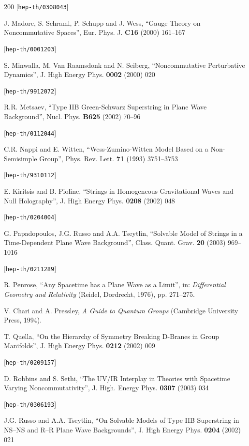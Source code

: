 \begin{thebibliography}{200}
 [{\tt hep-th/0308043}] 

 J. Madore, S. Schraml, P. Schupp and J. Wess, ``Gauge Theory on Noncommutative Spaces'', Eur. Phys. J. {\bf C16} (2000) 161--167 

 [{\tt hep-th/0001203}] 

 S. Minwalla, M. Van Raamsdonk and N. Seiberg, ``Noncommutative Perturbative Dynamics'', J. High Energy Phys. {\bf 0002} (2000) 020 

 [{\tt hep-th/9912072}] 

 R.R. Metsaev, ``Type IIB Green-Schwarz Superstring in Plane Wave Background'', Nucl. Phys. {\bf B625} (2002) 70--96 

 [{\tt hep-th/0112044}] 

 C.R. Nappi and E. Witten, ``Wess-Zumino-Witten Model Based on a Non-Semisimple Group'', Phys. Rev. Lett. {\bf 71} (1993) 3751--3753 

 [{\tt hep-th/9310112}] 

 E. Kiritsis and B. Pioline, ``Strings in Homogeneous Gravitational Waves and Null Holography'', J. High Energy Phys. {\bf 0208} (2002) 048 

 [{\tt hep-th/0204004}] 

 G. Papadopoulos, J.G. Russo and A.A. Tseytlin, ``Solvable Model of Strings in a Time-Dependent Plane Wave Background'', Class. Quant. Grav. {\bf 20} (2003) 969--1016 

 [{\tt hep-th/0211289}] 

 R. Penrose, ``Any Spacetime has a Plane Wave as a Limit'', in: {\it Differential Geometry and Relativity} (Reidel, Dordrecht, 1976), pp. 271--275. 

 V. Chari and A. Pressley, {\it A Guide to Quantum Groups} (Cambridge University Press, 1994). 

 T. Quella, ``On the Hierarchy of Symmetry Breaking D-Branes in Group Manifolds'', J. High Energy Phys. {\bf 0212} (2002) 009 

 [{\tt hep-th/0209157}] 

 D. Robbins and S. Sethi, ``The UV/IR Interplay in Theories with Spacetime Varying Noncommutativity'', J. High. Energy Phys. {\bf 0307} (2003) 034 

 [{\tt hep-th/0306193}] 

 J.G. Russo and A.A. Tseytlin, ``On Solvable Models of Type IIB Superstring in NS--NS and R--R Plane Wave Backgrounds'', J. High Energy Phys. {\bf 0204} (2002) 021 


\end{thebibliography}

